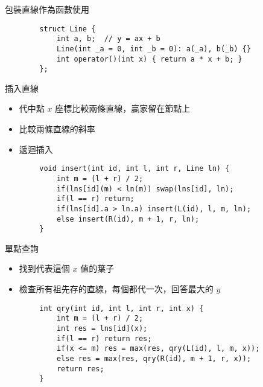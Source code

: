 \begin{frame}[fragile]{}
    包裝直線作為函數使用
    
    \begin{verbatim}
        struct Line {
            int a, b;  // y = ax + b
            Line(int _a = 0, int _b = 0): a(_a), b(_b) {}
            int operator()(int x) { return a * x + b; }
        };
    \end{verbatim}
\end{frame}

\begin{frame}[fragile]{}
    插入直線

    \begin{itemize}
        \item 代中點 $x$ 座標比較兩條直線，贏家留在節點上
        \item 比較兩條直線的斜率
        \item 遞迴插入
    \end{itemize}
    
    \begin{verbatim}
        void insert(int id, int l, int r, Line ln) {
            int m = (l + r) / 2;
            if(lns[id](m) < ln(m)) swap(lns[id], ln);
            if(l == r) return;
            if(lns[id].a > ln.a) insert(L(id), l, m, ln);
            else insert(R(id), m + 1, r, ln);
        }
    \end{verbatim}
\end{frame}

\begin{frame}[fragile]{}
    單點查詢

    \begin{itemize}
        \item 找到代表這個 $x$ 值的葉子
        \item 檢查所有祖先存的直線，每個都代一次，回答最大的 $y$
    \end{itemize}
    
    \begin{verbatim}
        int qry(int id, int l, int r, int x) {
            int m = (l + r) / 2;
            int res = lns[id](x);
            if(l == r) return res;
            if(x <= m) res = max(res, qry(L(id), l, m, x));
            else res = max(res, qry(R(id), m + 1, r, x));
            return res;
        }
    \end{verbatim}
\end{frame}

